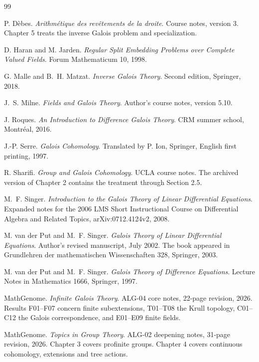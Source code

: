 \begingroup
\small
\begin{thebibliography}{99}
{}
\renewcommand{\runningchapter}{Bibliography}
\setlength{\itemsep}{4pt}

P. D\`ebes.
\emph{Arithm\'etique des rev\^etements de la droite}.
Course notes, version 3. Chapter 5 treats the inverse Galois problem
and specialization.

D. Haran and M. Jarden.
\emph{Regular Split Embedding Problems over Complete Valued Fields}.
Forum Mathematicum 10, 1998.

G. Malle and B.~H. Matzat.
\emph{Inverse Galois Theory}.
Second edition, Springer, 2018.

J.~S. Milne.
\emph{Fields and Galois Theory}.
Author's course notes, version 5.10.

J. Roques.
\emph{An Introduction to Difference Galois Theory}.
CRM summer school, Montr\'eal, 2016.

J.-P. Serre.
\emph{Galois Cohomology}.
Translated by P. Ion, Springer, English first printing, 1997.

R. Sharifi.
\emph{Group and Galois Cohomology}.
UCLA course notes. The archived version of Chapter 2 contains the
treatment through Section 2.5.

M.~F. Singer.
\emph{Introduction to the Galois Theory of Linear Differential Equations}.
Expanded notes for the 2006 LMS Short Instructional Course on
Differential Algebra and Related Topics, arXiv:0712.4124v2, 2008.

M. van der Put and M.~F. Singer.
\emph{Galois Theory of Linear Differential Equations}.
Author's revised manuscript, July 2002. The book appeared in
Grundlehren der mathematischen Wissenschaften 328, Springer, 2003.

M. van der Put and M.~F. Singer.
\emph{Galois Theory of Difference Equations}.
Lecture Notes in Mathematics 1666, Springer, 1997.

MathGenome.
\emph{Infinite Galois Theory}.
ALG-04 core notes, 22-page revision, 2026.
Results F01--F07 concern finite subextensions, T01--T08 the Krull
topology, C01--C12 the Galois correspondence, and E01--E09 finite fields.

MathGenome.
\emph{Topics in Group Theory}.
ALG-02 deepening notes, 31-page revision, 2026.
Chapter 3 covers profinite groups. Chapter 4 covers continuous
cohomology, extensions and tree actions.


\end{thebibliography}
